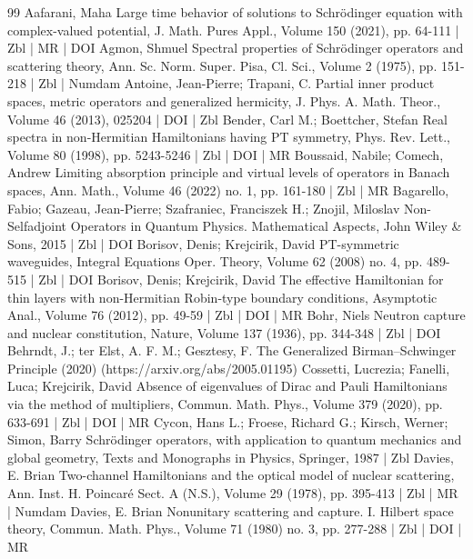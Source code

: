 \begin{thebibliography}{99}
Aafarani, Maha Large time behavior of solutions to Schrödinger equation with complex-valued potential, J. Math. Pures Appl., Volume 150 (2021), pp. 64-111 | Zbl | MR | DOI
Agmon, Shmuel Spectral properties of Schrödinger operators and scattering theory, Ann. Sc. Norm. Super. Pisa, Cl. Sci., Volume 2 (1975), pp. 151-218 | Zbl | Numdam
Antoine, Jean-Pierre; Trapani, C. Partial inner product spaces, metric operators and generalized hermicity, J. Phys. A. Math. Theor., Volume 46 (2013), 025204 | DOI | Zbl
Bender, Carl M.; Boettcher, Stefan Real spectra in non-Hermitian Hamiltonians having PT symmetry, Phys. Rev. Lett., Volume 80 (1998), pp. 5243-5246 | Zbl | DOI | MR
Boussaid, Nabile; Comech, Andrew Limiting absorption principle and virtual levels of operators in Banach spaces, Ann. Math., Volume 46 (2022) no. 1, pp. 161-180 | Zbl | MR
Bagarello, Fabio; Gazeau, Jean-Pierre; Szafraniec, Franciszek H.; Znojil, Miloslav Non-Selfadjoint Operators in Quantum Physics. Mathematical Aspects, John Wiley \& Sons, 2015 | Zbl | DOI
Borisov, Denis; Krejcirik, David PT-symmetric waveguides, Integral Equations Oper. Theory, Volume 62 (2008) no. 4, pp. 489-515 | Zbl | DOI
Borisov, Denis; Krejcirik, David The effective Hamiltonian for thin layers with non-Hermitian Robin-type boundary conditions, Asymptotic Anal., Volume 76 (2012), pp. 49-59 | Zbl | DOI | MR
Bohr, Niels Neutron capture and nuclear constitution, Nature, Volume 137 (1936), pp. 344-348 | Zbl | DOI
Behrndt, J.; ter Elst, A. F. M.; Gesztesy, F. The Generalized Birman–Schwinger Principle (2020) (https://arxiv.org/abs/2005.01195)
Cossetti, Lucrezia; Fanelli, Luca; Krejcirik, David Absence of eigenvalues of Dirac and Pauli Hamiltonians via the method of multipliers, Commun. Math. Phys., Volume 379 (2020), pp. 633-691 | Zbl | DOI | MR
Cycon, Hans L.; Froese, Richard G.; Kirsch, Werner; Simon, Barry Schrödinger operators, with application to quantum mechanics and global geometry, Texts and Monographs in Physics, Springer, 1987 | Zbl
Davies, E. Brian Two-channel Hamiltonians and the optical model of nuclear scattering, Ann. Inst. H. Poincaré Sect. A (N.S.), Volume 29 (1978), pp. 395-413 | Zbl | MR | Numdam
Davies, E. Brian Nonunitary scattering and capture. I. Hilbert space theory, Commun. Math. Phys., Volume 71 (1980) no. 3, pp. 277-288 | Zbl | DOI | MR

\end{thebibliography}
